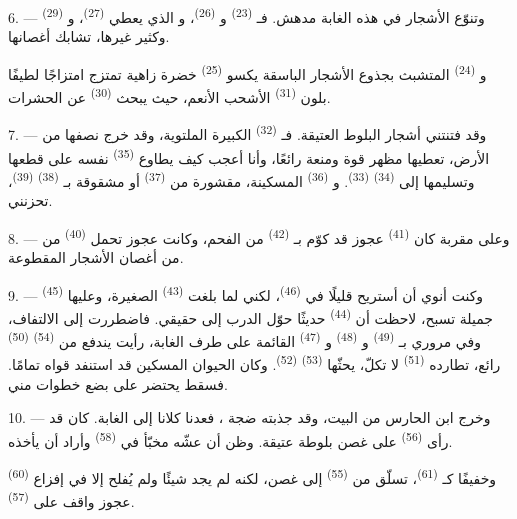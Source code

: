 6. --- وتنوّع الأشجار في هذه الغابة مدهش. فـ \textsuperscript{(23)}
و \textsuperscript{(26)}، و الذي يعطي
 \textsuperscript{(27)}، و \textsuperscript{(29)} وكثير
غيرها، تشابك أغصانها.

و \textsuperscript{(24)} المتشبث بجذوع الأشجار الباسقة يكسو
 \textsuperscript{(25)} خضرة زاهية تمتزج امتزاجًا لطيفًا
بلون  \textsuperscript{(31)} الأشحب الأنعم، حيث يبحث
 \textsuperscript{(30)} عن الحشرات.

\VUsaut{3.0mm}
\VUsaut{3.0mm}

7. --- وقد فتنتني أشجار البلوط العتيقة. فـ \textsuperscript{(32)}
الكبيرة الملتوية، وقد خرج نصفها من الأرض، تعطيها مظهر قوة ومنعة رائعًا،
وأنا أعجب كيف يطاوع  \textsuperscript{(35)} نفسه على قطعها
وتسليمها إلى  \textsuperscript{(34)} 
\textsuperscript{(33)}. و \textsuperscript{(36)} المسكينة، مقشورة من
 \textsuperscript{(37)} أو مشقوقة بـ \textsuperscript{(38)}
 \textsuperscript{(39)}، تحزنني.

8. --- وعلى مقربة كان  \textsuperscript{(41)} عجوز قد كوّم
بـ  \textsuperscript{(42)} من الفحم، وكانت عجوز
تحمل  \textsuperscript{(40)} من  من أغصان
الأشجار المقطوعة.

\VUsaut{3.0mm}
\VUsaut{3.0mm}

9. --- وكنت أنوي أن أستريح قليلًا في 
\textsuperscript{(46)}، لكني لما بلغت  \textsuperscript{(43)} الصغيرة،
وعليها  \textsuperscript{(45)} جميلة تسبح، لاحظت أن 
\textsuperscript{(44)} حديثًا حوّل الدرب إلى  حقيقي. فاضطررت إلى
الالتفاف، وفي مروري بـ \textsuperscript{(49)} و
\textsuperscript{(48)} و \textsuperscript{(47)} القائمة على طرف
الغابة، رأيت يندفع من  \textsuperscript{(54)}
 \textsuperscript{(50)} رائع، تطارده  \textsuperscript{(51)}
لا تكلّ، يحثّها  \textsuperscript{(53)} 
\textsuperscript{(52)}. وكان الحيوان المسكين قد استنفد قواه تمامًا. فسقط يحتضر
على بضع خطوات مني.

10. --- وخرج ابن الحارس من البيت، وقد جذبته ضجة ، فعدنا
كلانا إلى الغابة. كان قد رأى  \textsuperscript{(56)} على غصن
بلوطة عتيقة. وظن أن عشّه مخبّأ في  \textsuperscript{(58)} وأراد
أن يأخذه.

وخفيفًا كـ \textsuperscript{(61)}، تسلّق من 
\textsuperscript{(55)} إلى غصن، لكنه لم يجد شيئًا ولم يُفلح إلا في إفزاع
 \textsuperscript{(60)} عجوز واقف على  \textsuperscript{(57)}.
\VUsaut{4.0mm}
\VUfilet{22mm}
